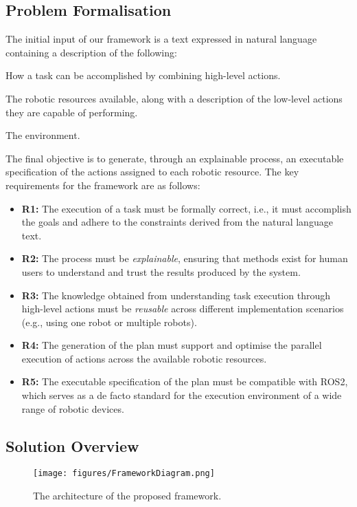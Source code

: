 \subsection{Problem Formalisation}

The initial input of our framework is a text expressed in natural language containing a description of the following:
\begin{enumerate*}
    \item How a task can be accomplished by combining high-level actions.
    \item The robotic resources available, along with a description of the low-level actions they are capable of performing.
    \item The environment.
\end{enumerate*}
The final objective is to generate, through an explainable process, an executable specification of the actions assigned to each robotic resource. The key requirements for the framework are as follows:
\begin{itemize}
    \item \textbf{R1:} The execution of a task must be formally correct, i.e., it must accomplish the goals and adhere to the constraints derived from the natural language text.
    \item \textbf{R2:} The process must be \emph{explainable}, ensuring that methods exist for human users to understand and trust the results produced by the system.
    \item \textbf{R3:} The knowledge obtained from understanding task execution through high-level actions must be \emph{reusable} across different implementation scenarios (e.g., using one robot or multiple robots).
    \item \textbf{R4:} The generation of the plan must support and optimise the parallel execution of actions across the available robotic resources.
    \item \textbf{R5:} The executable specification of the plan must be compatible with ROS2, which serves as a de facto standard for the execution environment of a wide range of robotic devices.
\end{itemize}

\subsection{Solution Overview}
\label{ssec:contributions}

\begin{figure*}[t!]
    \centering
    \texttt{[image: figures/FrameworkDiagram.png]}
    \caption{The architecture of the proposed framework.}
    \label{fig:arch_LLM_pKB}
\end{figure*}



